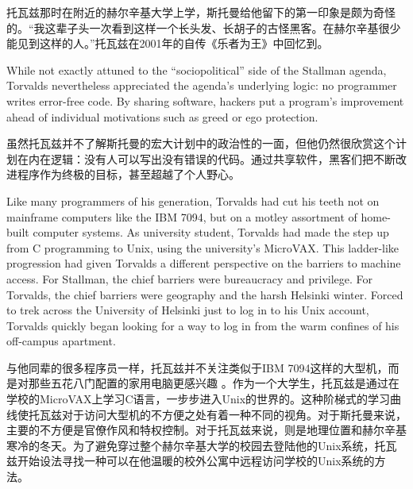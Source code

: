 \ifdefined\chs
托瓦兹那时在附近的赫尔辛基大学上学，斯托曼给他留下的第一印象是颇为奇怪的。``我这辈子头一次看到这样一个长头发、长胡子的古怪黑客。在赫尔辛基很少能见到这样的人。''托瓦兹在2001年的自传《乐者为王》中回忆到。
\fi

\ifdefined\eng
While not exactly attuned to the ``sociopolitical'' side of the Stallman agenda, Torvalds nevertheless appreciated the agenda's underlying logic: no programmer writes error-free code. By sharing software, hackers put a program's improvement ahead of individual motivations such as greed or ego protection.
\fi

\ifdefined\chs
虽然托瓦兹并不了解斯托曼的宏大计划中的政治性的一面，但他仍然很欣赏这个计划在内在逻辑：没有人可以写出没有错误的代码。通过共享软件，黑客们把不断改进程序作为终极的目标，甚至超越了个人野心。
\fi

\ifdefined\eng
Like many programmers of his generation, Torvalds had cut his teeth not on mainframe computers like the IBM 7094, but on a motley assortment of home-built computer systems. As university student, Torvalds had made the step up from C programming to Unix, using the university's MicroVAX. This ladder-like progression had given Torvalds a different perspective on the barriers to machine access. For Stallman, the chief barriers were bureaucracy and privilege. For Torvalds, the chief barriers were geography and the harsh Helsinki winter. Forced to trek across the University of Helsinki just to log in to his Unix account, Torvalds quickly began looking for a way to log in from the warm confines of his off-campus apartment.
\fi

\ifdefined\chs
与他同辈的很多程序员一样，托瓦兹并不关注类似于IBM 7094这样的大型机，而是对那些五花八门配置的家用电脑更感兴趣 。作为一个大学生，托瓦兹是通过在学校的MicroVAX上学习C语言，一步步进入Unix的世界的。这种阶梯式的学习曲线使托瓦兹对于访问大型机的不方便之处有着一种不同的视角。对于斯托曼来说，主要的不方便是官僚作风和特权控制。对于托瓦兹来说，则是地理位置和赫尔辛基寒冷的冬天。为了避免穿过整个赫尔辛基大学的校园去登陆他的Unix系统，托瓦兹开始设法寻找一种可以在他温暖的校外公寓中远程访问学校的Unix系统的方法。
\fi

